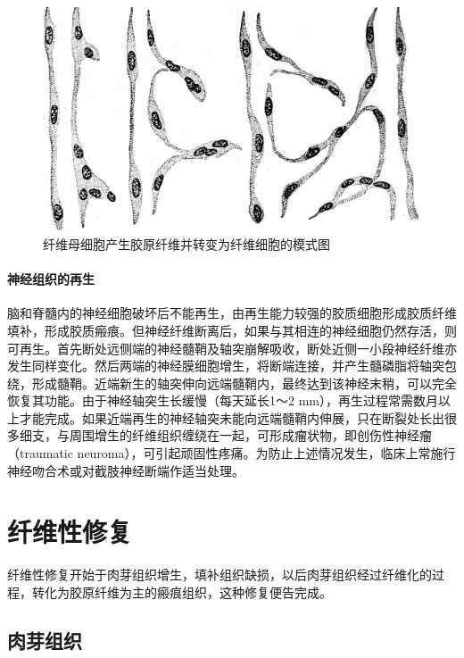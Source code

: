 \begin{figure}[!h]
	\begin{center}
		\includegraphics{./images/Image00024.jpg}
	\end{center}
	\captionsetup{justification=centering}
	\caption{纤维母细胞产生胶原纤维并转变为纤维细胞的模式图}
	\label{fig2-2}
\end{figure}

\paragraph{神经组织的再生}
脑和脊髓内的神经细胞破坏后不能再生，由再生能力较强的胶质细胞形成胶质纤维填补，形成胶质瘢痕。但神经纤维断离后，如果与其相连的神经细胞仍然存活，则可再生。首先断处远侧端的神经髓鞘及轴突崩解吸收，断处近侧一小段神经纤维亦发生同样变化。然后两端的神经膜细胞增生，将断端连接，并产生髓磷脂将轴突包绕，形成髓鞘。近端新生的轴突伸向远端髓鞘内，最终达到该神经末稍，可以完全恢复其功能。由于神经轴突生长缓慢（每天延长1～2
mm），再生过程常需数月以上才能完成。如果近端再生的神经轴突未能向远端髓鞘内伸展，只在断裂处长出很多细支，与周围增生的纤维组织缠绕在一起，可形成瘤状物，即创伤性神经瘤（traumatic
neuroma），可引起顽固性疼痛。为防止上述情况发生，临床上常施行神经吻合术或对截肢神经断端作适当处理。

\section{纤维性修复}

纤维性修复开始于肉芽组织增生，填补组织缺损，以后肉芽组织经过纤维化的过程，转化为胶原纤维为主的瘢痕组织，这种修复便告完成。

\subsection{肉芽组织}

